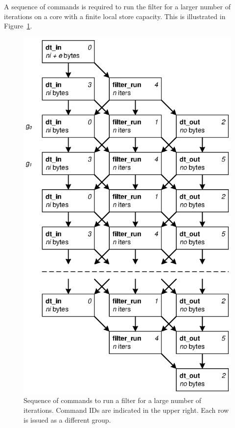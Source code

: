 A sequence of commands is required to run the filter for a larger
number of iterations on a core with a finite local store
capacity. This is illustrated in Figure~\ref{fig:lib:ext}.

\begin{figure}[!htb]
\begin{center}
\includegraphics[scale=.90]{figs/ext}
\end{center}
\caption[Sequence of commands to run a filter for a large number of iterations.]{Sequence of commands to run a filter for a large number of iterations. Command IDs are indicated in the upper right. Each row is issued as a different group.}
\label{fig:lib:ext}
\end{figure}

